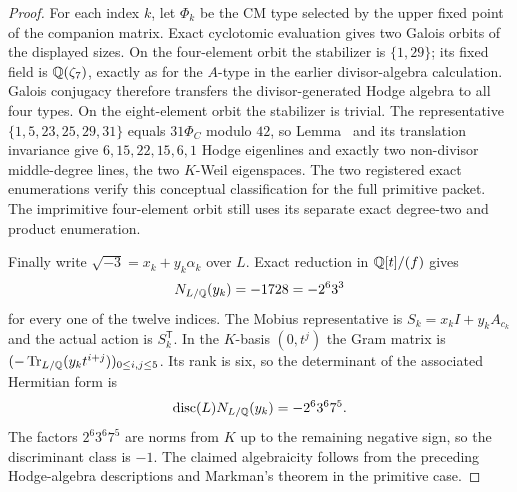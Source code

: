 \begin{proof}
For each index $k$, let $\Phi_k$ be the CM type selected by the upper
fixed point of the companion matrix.  Exact cyclotomic evaluation gives two
Galois orbits of the displayed sizes.  On the four-element orbit the
stabilizer is $\{1,29\}$; its fixed field is $\mathbb Q(\zeta_7)$, exactly as for
the $A$-type in the earlier divisor-algebra calculation.  Galois conjugacy
therefore transfers the divisor-generated Hodge algebra to all four types.
On the eight-element orbit the stabilizer is trivial.  The representative
$\{1,5,23,25,29,31\}$ equals
$31\Phi_C$ modulo $42$, so Lemma~ and its translation
invariance give $6,15,22,15,6,1$ Hodge eigenlines and exactly two non-divisor
middle-degree lines, the two $K$-Weil eigenspaces.  The two registered exact
enumerations verify this conceptual classification for the full primitive
packet.  The imprimitive four-element orbit still uses its separate exact
degree-two and product enumeration.

Finally write $\sqrt{-3}=x_k+y_k\alpha_k$ over $L$.  Exact reduction in
$\mathbb Q[t]/(f)$ gives
\[
 N_{L/\mathbb Q}(y_k)=-1728=-2^6 3^3
\]
for every one of the twelve indices. The Mobius representative is
$S_k=x_kI+y_kA_{c_k}$ and the actual action is $S_k^{\mathsf T}$.
In the $K$-basis $(0,t^j)$ the Gram matrix is
$(-\operatorname{Tr}_{L/\mathbb Q}(y_kt^{i+j}))_{0\le i,j\le5}$.
Its rank is six, so the determinant of the associated Hermitian form is
\[
 \operatorname{disc}(L)N_{L/\mathbb Q}(y_k)
 =-2^6 3^6 7^5.
\]
The factors $2^6 3^6 7^5$ are norms from $K$ up to the remaining negative
sign, so the discriminant class is $-1$.  The claimed algebraicity follows
from the preceding Hodge-algebra descriptions and Markman's theorem in the
primitive case.
\end{proof}

